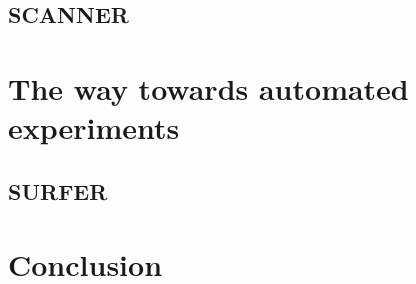 \documentclass[11pt]{article}
\begin{document}
\subsection{SCANNER}



\section{The way towards automated experiments}

\subsection{SURFER}

\section{Conclusion}



\end{document}
